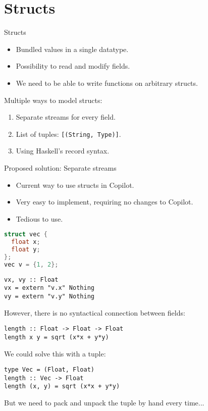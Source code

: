 \documentclass{beamer}
\begin{document}
\section{Structs}
\begin{frame}{Structs}
  \begin{itemize}
    \item Bundled values in a single datatype.
    \item Possibility to read and modify fields.
    \item We need to be able to write functions on arbitrary structs.
  \end{itemize}

  Multiple ways to model structs:
    \begin{enumerate}
      \item Separate streams for every field.
      \item List of tuples: \texttt{[(String, Type)]}.
      \item Using Haskell's record syntax.
    \end{enumerate}
\end{frame}



\begin{frame}[fragile]{Proposed solution: Separate streams}
  \begin{itemize}
    \item Current way to use structs in Copilot.
    \item Very easy to implement, requiring no changes to Copilot.
    \item Tedious to use.
  \end{itemize}
\begin{lstlisting}[language=c]
struct vec {
  float x;
  float y;
};
vec v = {1, 2};
\end{lstlisting}
\begin{lstlisting}
vx, vy :: Float
vx = extern "v.x" Nothing
vy = extern "v.y" Nothing
\end{lstlisting}
\end{frame}

\begin{frame}[fragile]
  However, there is no syntactical connection between fields:
\begin{lstlisting}
length :: Float -> Float -> Float
length x y = sqrt (x*x + y*y)
\end{lstlisting}

  We could solve this with a tuple:
\begin{lstlisting}
type Vec = (Float, Float)
length :: Vec -> Float
length (x, y) = sqrt (x*x + y*y)
\end{lstlisting}

  But we need to pack and unpack the tuple by hand every time...
\end{frame}
\end{document}
